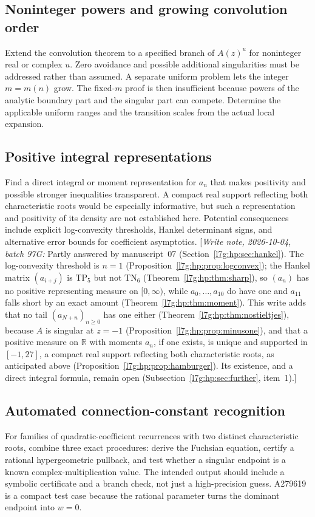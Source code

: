 \documentclass[11pt,letterpaper]{article}
\theoremstyle{remark}\newtheorem{remark}[theorem]{Remark}
\newcommand{\hpnote}[1]{\textup{[}\emph{Write note, 2026-10-04, batch 97G:} #1\textup{]}}
\newcommand{\TP}{\mathrm{TP}}\newcommand{\TN}{\mathrm{TN}}
\newcounter{l7gtrsavedeq}
\begin{document}
\subsection{Noninteger powers and growing convolution order}
Extend the convolution theorem to a specified branch of $A(z)^u$ for
noninteger real or complex $u$. Zero avoidance and possible additional
singularities must be addressed rather than assumed. A separate
uniform problem lets the integer $m=m(n)$ grow. The fixed-$m$ proof
is then insufficient because powers of the analytic boundary part
and the singular part can compete. Determine the applicable uniform
ranges and the transition scales from the actual local expansion.

\subsection{Positive integral representations}
Find a direct integral or moment representation for $a_n$ that makes
positivity and possible stronger inequalities transparent. A compact
real support reflecting both characteristic roots would be especially
informative, but such a representation and positivity of its density
are not established here. Potential consequences include explicit
log-convexity thresholds, Hankel determinant signs, and alternative
error bounds for coefficient asymptotics.
\hpnote{Partly answered by manuscript~07 (Section~\ref{l7g:hp:sec:hankel}).
The log-convexity threshold is $n=1$
(Proposition~\ref{l7g:hp:prop:logconvex}); the Hankel matrix $(a_{i+j})$
is $\TP_5$ but not $\TN_6$ (Theorem~\ref{l7g:hp:thm:sharp}), so $(a_n)$
has no positive representing measure on $[0,\infty)$, while
$a_0,\dots,a_{10}$ do have one and $a_{11}$ falls short by an exact amount
(Theorem~\ref{l7g:hp:thm:moment}). This write adds that no tail
$(a_{N+n})_{n\ge0}$ has one either (Theorem~\ref{l7g:hp:thm:nostieltjes}),
because $A$ is singular at $z=-1$ (Proposition~\ref{l7g:hp:prop:minusone}),
and that a positive measure on $\mathbb R$ with moments $a_n$, if one
exists, is unique and supported in $[-1,27]$, a compact real support
reflecting both characteristic roots, as anticipated above
(Proposition~\ref{l7g:hp:prop:hamburger}). Its existence, and a direct
integral formula, remain open (Subsection~\ref{l7g:hp:sec:further},
item~1).}

\subsection{Automated connection-constant recognition}
For families of quadratic-coefficient recurrences with two distinct
characteristic roots, combine three exact procedures: derive the
Fuchsian equation, certify a rational hypergeometric pullback, and test
whether a singular endpoint is a known complex-multiplication value.
The intended output should include a symbolic certificate and a branch
check, not just a high-precision guess. A279619 is a compact test case
because the rational parameter turns the dominant endpoint into $w=0$.
\end{document}
